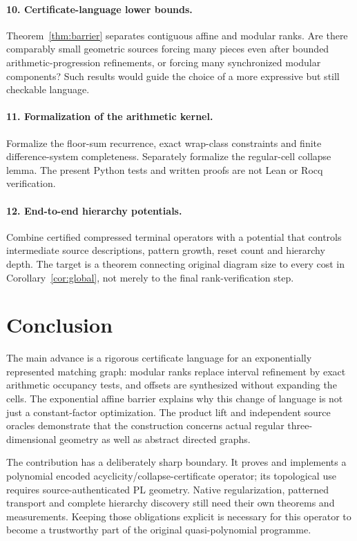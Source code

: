 \documentclass[11pt,letterpaper]{article}
\theoremstyle{definition}
\theoremstyle{remark}\newtheorem{remark}[theorem]{Remark}
\begin{document}
\paragraph{10. Certificate-language lower bounds.}
Theorem~\ref{thm:barrier} separates contiguous affine and modular ranks. Are there comparably small geometric sources forcing many pieces even after bounded arithmetic-progression refinements, or forcing many synchronized modular components? Such results would guide the choice of a more expressive but still checkable language.

\paragraph{11. Formalization of the arithmetic kernel.}
Formalize the floor-sum recurrence, exact wrap-class constraints and finite difference-system completeness. Separately formalize the regular-cell collapse lemma. The present Python tests and written proofs are not Lean or Rocq verification.

\paragraph{12. End-to-end hierarchy potentials.}
Combine certified compressed terminal operators with a potential that controls intermediate source descriptions, pattern growth, reset count and hierarchy depth. The target is a theorem connecting original diagram size to every cost in Corollary~\ref{cor:global}, not merely to the final rank-verification step.

\section{Conclusion}

The main advance is a rigorous certificate language for an exponentially represented matching graph: modular ranks replace interval refinement by exact arithmetic occupancy tests, and offsets are synthesized without expanding the cells. The exponential affine barrier explains why this change of language is not just a constant-factor optimization. The product lift and independent source oracles demonstrate that the construction concerns actual regular three-dimensional geometry as well as abstract directed graphs.

The contribution has a deliberately sharp boundary. It proves and implements a polynomial encoded acyclicity/collapse-certificate operator; its topological use requires source-authenticated PL geometry. Native regularization, patterned transport and complete hierarchy discovery still need their own theorems and measurements. Keeping those obligations explicit is necessary for this operator to become a trustworthy part of the original quasi-polynomial programme.
\end{document}
